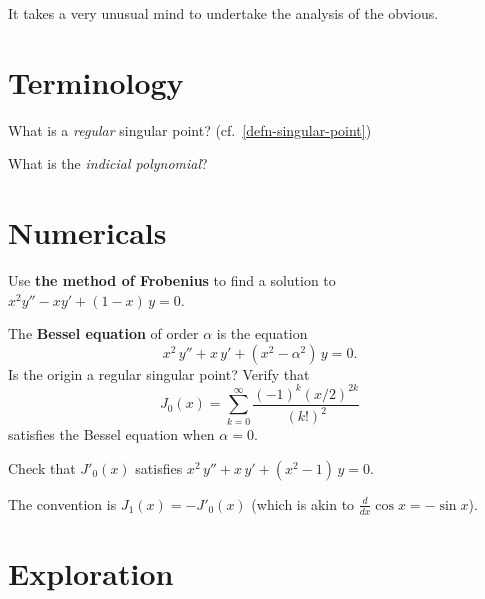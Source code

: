 \documentclass{homework}
\author{Jim Fowler}
\begin{document}
\maketitle

\begin{inspiration}
It takes a very unusual mind to undertake the analysis of the obvious. \\
\end{inspiration}

\section{Terminology}

\begin{problem}
  What is a \textit{regular} singular point?  (cf.~\ref{defn-singular-point})
\end{problem}

\begin{problem}
  What is the \textit{indicial polynomial}?
\end{problem}

\section{Numericals}

\begin{problem}
  Use \textbf{the method of Frobenius} to find a solution to \(x^2 y'' - x y' + (1-x) \, y = 0\).

\end{problem}

\begin{problem}\label{bessel-j0}The \textbf{Bessel equation} of order
  $\alpha$ is the equation
  \[
    x^2 \, y'' + x \, y' + (x^2 - \alpha^2) \, y = 0.
  \]
  Is the origin a regular singular point?  Verify that
  \[
    J_0(x) = \sum_{k=0}^\infty \frac{(-1)^k (x/2)^{2k}}{(k!)^2}
  \]
  satisfies the Bessel equation when $\alpha = 0$.
\end{problem}

\begin{problem}
  Check that $J'_0(x)$ satisfies \(x^2 \, y'' + x \, y' + (x^2 - 1) \, y = 0\).
  
  The convention is $J_1(x) = - J'_0(x)$ (which is akin to $\frac{d}{dx} \cos x = - \sin x$).
\end{problem}

\section{Exploration}
\end{document}
